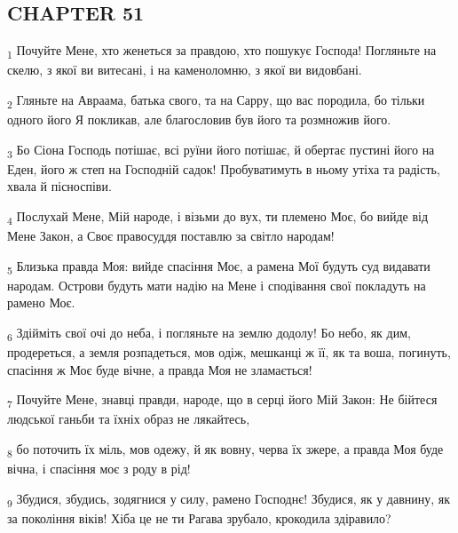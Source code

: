 \subsection{CHAPTER 51}
\begin{tcolorbox}
\textsubscript{1} Почуйте Мене, хто женеться за правдою, хто пошукує Господа! Погляньте на скелю, з якої ви витесані, і на каменоломню, з якої ви видовбані.
\end{tcolorbox}
\begin{tcolorbox}
\textsubscript{2} Гляньте на Авраама, батька свого, та на Сарру, що вас породила, бо тільки одного його Я покликав, але благословив був його та розмножив його.
\end{tcolorbox}
\begin{tcolorbox}
\textsubscript{3} Бо Сіона Господь потішає, всі руїни його потішає, й обертає пустині його на Еден, його ж степ на Господній садок! Пробуватимуть в ньому утіха та радість, хвала й пісноспіви.
\end{tcolorbox}
\begin{tcolorbox}
\textsubscript{4} Послухай Мене, Мій народе, і візьми до вух, ти племено Моє, бо вийде від Мене Закон, а Своє правосуддя поставлю за світло народам!
\end{tcolorbox}
\begin{tcolorbox}
\textsubscript{5} Близька правда Моя: вийде спасіння Моє, а рамена Мої будуть суд видавати народам. Острови будуть мати надію на Мене і сподівання свої покладуть на рамено Моє.
\end{tcolorbox}
\begin{tcolorbox}
\textsubscript{6} Здійміть свої очі до неба, і погляньте на землю додолу! Бо небо, як дим, продереться, а земля розпадеться, мов одіж, мешканці ж її, як та воша, погинуть, спасіння ж Моє буде вічне, а правда Моя не зламається!
\end{tcolorbox}
\begin{tcolorbox}
\textsubscript{7} Почуйте Мене, знавці правди, народе, що в серці його Мій Закон: Не бійтеся людської ганьби та їхніх образ не лякайтесь,
\end{tcolorbox}
\begin{tcolorbox}
\textsubscript{8} бо поточить їх міль, мов одежу, й як вовну, черва їх зжере, а правда Моя буде вічна, і спасіння моє з роду в рід!
\end{tcolorbox}
\begin{tcolorbox}
\textsubscript{9} Збудися, збудись, зодягнися у силу, рамено Господнє! Збудися, як у давнину, як за покоління віків! Хіба це не ти Рагава зрубало, крокодила здіравило?
\end{tcolorbox}
